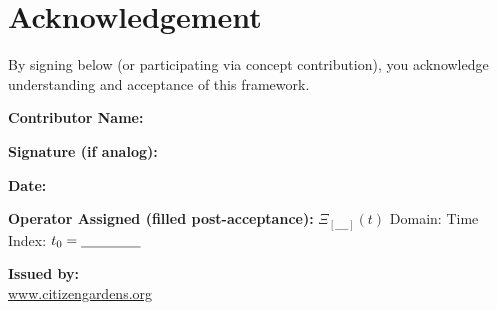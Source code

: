 \documentclass[12pt]{article}
\begin{document}
\section{Acknowledgement}
By signing below (or participating via concept contribution), you acknowledge understanding and acceptance of this framework.

\vspace{1.5cm}
\noindent \textbf{Contributor Name:} \hrulefill

\noindent \textbf{Signature (if analog):} \hrulefill

\noindent \textbf{Date:} \hrulefill

\noindent \textbf{Operator Assigned (filled post-acceptance):} $\Xi_{[\_\_\_\_]}(t)$ \quad Domain: \underline{\hspace{2cm}} \quad Time Index: $t_0 = \underline{\hspace{1.5cm}}$

\vspace{1.5cm}
\noindent \textbf{Issued by:}\\
\url{www.citizengardens.org}
\end{document}
